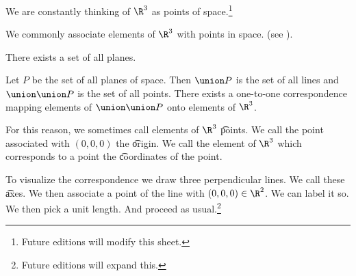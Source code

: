 

We are constantly thinking of $\R^3$ as points of space.\footnote{Future editions will modify this sheet.}


We commonly associate elements of $\R^3$ with points in space. (see ).

\begin{principle}
  There exists a set of all planes.
\end{principle}

\begin{principle}
  Let $P$ be the set of all planes of space.
  Then $\union P$ is the set of all lines and $\union \union P$ is the set of all points.
  There exists a one-to-one correspondence mapping elements of $\union \union P$ onto elements of $\R^3$.
\end{principle}
For this reason, we sometimes call elements of $\R^3$ \t{points}.
We call the point associated with $(0, 0, 0)$ the \t{origin}.
We call the element of $\R^3$ which corresponds to a point the \t{coordinates} of the point.


To visualize the correspondence we draw three perpendicular lines.
We call these \t{axes}.
We then associate a point of the line with $(0, 0, 0) \in \R^2$.
We can label it so.
We then pick a unit length.
And proceed as usual.\footnote{Future editions will expand this.}

\blankpage
